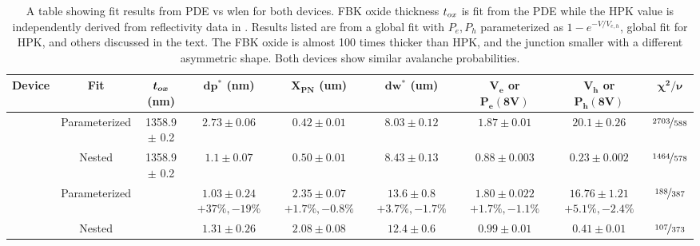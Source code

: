 \begin{table}[h]
\centering
\caption{A table showing fit results from PDE vs wlen for both devices. FBK oxide thickness $\tox$ is fit from the PDE while the HPK value is independently derived from reflectivity data in \cite{sipmRef_nexo_guofu}. Results listed are from a global fit with $P_e, P_h$ parameterized as $1-e^{-V/V_{e,h}}$, global fit for HPK, and others discussed in the text. The FBK oxide is almost 100 times thicker than HPK, and the junction smaller with a different asymmetric shape. Both devices show similar avalanche probabilities.
\label{tab:fitResults}
}
\smallskip
{\scriptsize
\setlength{\tabcolsep}{2.5pt}
\renewcommand{\arraystretch}{2.5}  %
\begin{tabular}{|c|c|c|c|c|c|c|c|c|}
    \hline
    \textbf{Device} & \textbf{Fit} & $\bm{t_{ox}}$ (nm) & $\bm{dp^*}$ (nm) & $\bm{X_{PN}}$ (um) & $\bm{dw^*}$ (um) & $\bm{V_e}$ or $\bm{P_e(8\text{V})}$ & $\bm{V_h}$ or $\bm{P_h(8\text{V})}$ & $\bm{\chi^2/\nu}$ \\
    
    \hline

     & Parameterized & 1358.9 $\pm$ 0.2  & $2.73 \pm 0.06$ & $0.42 \pm 0.01$ & $8.03 \pm 0.12$ & $1.87 \pm 0.01$ & $20.1 \pm 0.26$ & $\nicefrac{2703}{588}$  \\
    
    
     & Nested & 1358.9 $\pm$ 0.2  & $1.1 \pm 0.07$ & $0.50 \pm 0.01$ & $8.43 \pm 0.13$ & $0.88 \pm 0.003$ & $0.23 \pm 0.002$ &  $\nicefrac{1464}{578}$  \\
    \hline
    
     & Parameterized &
     & 
     &
     & 
     &
     & 
     & $\nicefrac{188}{387}$ \\
     
    
     & Nested &  & 
    $1.31 \pm 0.26$ & $2.08 \pm 0.08$ & 
    $12.4 \pm 0.6$ & $0.99 \pm 0.01$ & $0.41\pm 0.01$ & $\nicefrac{107}{373}$ \\
    
    \hline
    
\end{tabular}
} %
\end{table}

